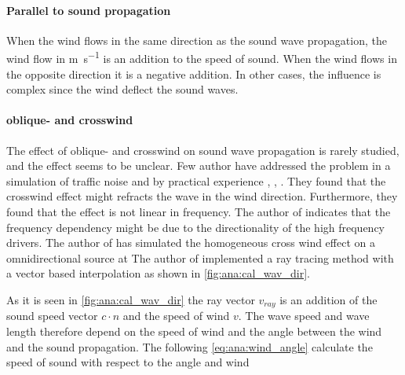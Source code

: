 \paragraph{Parallel to sound propagation} When the wind flows in the same direction as the sound wave propagation, the wind flow in \si{\meter\per\second} is an addition to the speed of sound. When the wind flows in the opposite direction it is a negative addition.  In other cases, the influence is complex since the wind deflect the sound waves.

\paragraph{oblique- and crosswind} The effect of oblique- and crosswind on sound wave propagation is rarely studied, and the effect seems to be unclear. Few author have addressed the problem in a simulation of traffic noise and by practical experience \citep{effect_of_wind}, \citep{crosswind_effect_2016}, \citep{BALLOU2008xi}. They found that the crosswind effect might refracts the wave in the wind direction. Furthermore, they found that the effect is not linear in frequency. The author of \citep{BALLOU2008xi} indicates that the frequency dependency might be due to the directionality of the high frequency drivers. The author of \citep{crosswind_simulation} has simulated the homogeneous cross wind effect on a omnidirectional source at  The author of \citep{ray_tracing} implemented a ray tracing method with a vector based interpolation as shown in \autoref{fig:ana:cal_wav_dir}.



\startexplain
{}
\stopexplain

As it is seen in \autoref{fig:ana:cal_wav_dir} the ray vector $v_{ray}$ is an addition of the sound speed vector $c \cdot n$ and the speed of wind $v$. The wave speed and wave length therefore depend on the speed of wind and the angle between the wind and the sound propagation. The following \autoref{eq:ana:wind_angle} calculate the speed of sound with respect to the angle and wind 


